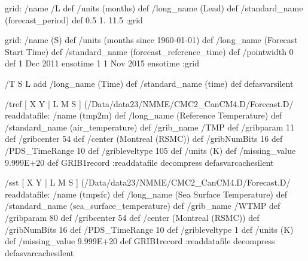 \begin{ingrid}
grid:
/name /L def
/units (months) def
/long_name (Lead) def
/standard_name (forecast_period) def
0.5 1. 11.5
:grid

grid:
/name (S) def
/units (months since 1960-01-01) def
/long_name (Forecast Start Time) def
/standard_name (forecast_reference_time) def
/pointwidth 0 def
1 Dec 2011 ensotime
1
1 Nov 2015 ensotime
:grid


%

/T { S L add
/long_name (Time) def
/standard_name (time) def } defasvarsilent

/tref {
[ X Y | L M S ] (/Data/data23/NMME/CMC2_CanCM4.D/Forecast.D/%
readdatafile: 
/name (tmp2m) def
/long_name (Reference Temperature) def
/standard_name (air_temperature) def
/grib_name /TMP def
/gribparam 11 def
/gribcenter 54 def
/center (Montreal (RSMC)) def
/gribNumBits 16 def
/PDS_TimeRange 10 def
/gribleveltype 105 def
/units (K) def
/missing_value 9.999E+20 def
GRIB1record
:readdatafile decompress
} defasvarcachesilent

/sst {
[ X Y | L M S ] (/Data/data23/NMME/CMC2_CanCM4.D/Forecast.D/%
readdatafile: 
/name (tmpsfc) def
/long_name (Sea Surface Temperature) def
/standard_name (sea_surface_temperature) def
/grib_name /WTMP def
/gribparam 80 def
/gribcenter 54 def
/center (Montreal (RSMC)) def
/gribNumBits 16 def
/PDS_TimeRange 10 def
/gribleveltype 1 def
/units (K) def
/missing_value 9.999E+20 def
GRIB1record
:readdatafile decompress
} defasvarcachesilent


\end{ingrid}

